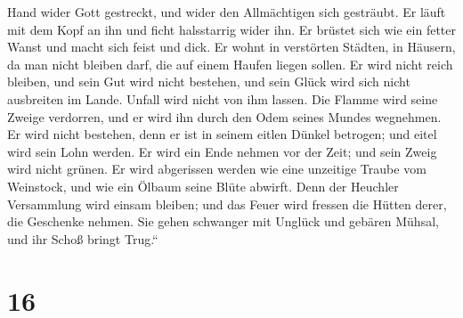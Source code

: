 Hand wider Gott gestreckt, und wider den Allmächtigen sich gesträubt.
 Er läuft mit dem Kopf an ihn und ficht halsstarrig wider
ihn.  Er brüstet sich wie ein fetter Wanst und macht sich
feist und dick.  Er wohnt in verstörten Städten, in
Häusern, da man nicht bleiben darf, die auf einem Haufen liegen sollen.
 Er wird nicht reich bleiben, und sein Gut wird nicht
bestehen, und sein Glück wird sich nicht ausbreiten im Lande.
 Unfall wird nicht von ihm lassen. Die Flamme wird seine
Zweige verdorren, und er wird ihn durch den Odem seines Mundes
wegnehmen.  Er wird nicht bestehen, denn er ist in seinem
eitlen Dünkel betrogen; und eitel wird sein Lohn werden. 
Er wird ein Ende nehmen vor der Zeit; und sein Zweig wird nicht grünen.
 Er wird abgerissen werden wie eine unzeitige Traube vom
Weinstock, und wie ein Ölbaum seine Blüte abwirft.  Denn
der Heuchler Versammlung wird einsam bleiben; und das Feuer wird fressen
die Hütten derer, die Geschenke nehmen.  Sie gehen
schwanger mit Unglück und gebären Mühsal, und ihr Schoß bringt Trug.``

\hypertarget{section-15}{%
\section{16}\label{section-15}}


